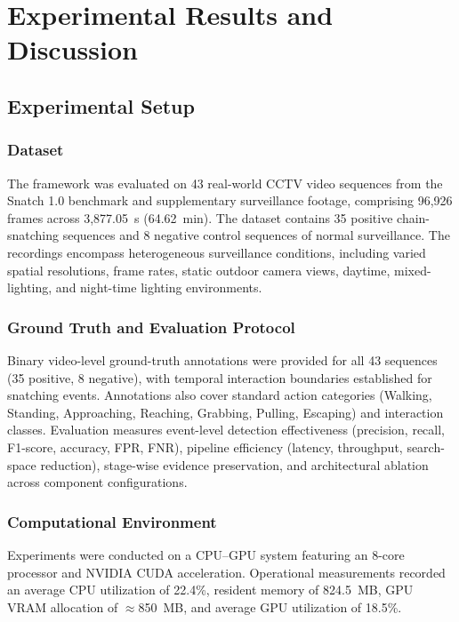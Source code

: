 \documentclass[runningheads]{llncs}
\begin{document}
\section{Experimental Results and Discussion}

\subsection{Experimental Setup}

\subsubsection{Dataset}

The framework was evaluated on 43 real-world CCTV video sequences from the Snatch 1.0 benchmark and supplementary surveillance footage, comprising 96,926 frames across 3,877.05~s (64.62~min). The dataset contains 35 positive chain-snatching sequences and 8 negative control sequences of normal surveillance. The recordings encompass heterogeneous surveillance conditions, including varied spatial resolutions, frame rates, static outdoor camera views, daytime, mixed-lighting, and night-time lighting environments.

\subsubsection{Ground Truth and Evaluation Protocol}

Binary video-level ground-truth annotations were provided for all 43 sequences (35 positive, 8 negative), with temporal interaction boundaries established for snatching events. Annotations also cover standard action categories (Walking, Standing, Approaching, Reaching, Grabbing, Pulling, Escaping) and interaction classes. Evaluation measures event-level detection effectiveness (precision, recall, F1-score, accuracy, FPR, FNR), pipeline efficiency (latency, throughput, search-space reduction), stage-wise evidence preservation, and architectural ablation across component configurations.

\subsubsection{Computational Environment}

Experiments were conducted on a CPU--GPU system featuring an 8-core processor and NVIDIA CUDA acceleration. Operational measurements recorded an average CPU utilization of 22.4\%, resident memory of 824.5~MB, GPU VRAM allocation of $\approx$850~MB, and average GPU utilization of 18.5\%.
\end{document}
